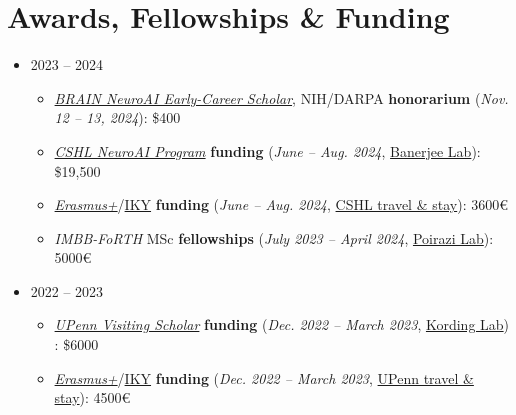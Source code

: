 \documentclass[letterpaper,11pt]{article}
\begin{document}
\section{Awards, Fellowships \& Funding}
\begin{itemize}
  \item 2023 -- 2024
    \setlength\itemsep{-0.3em}
    \begin{itemize}
      \item \textit{\href{https://n4solutionsllc.com/brainneuroai/}{BRAIN NeuroAI Early-Career Scholar}}, NIH/DARPA \textbf{honorarium} (\textit{Nov. 12 -- 13, 2024})\label{CSHLNeuroAIResearchInternFundingMarker}: \$400
      \item \textit{\href{https://www.cshl.edu/research/neuroscience/neuroai/}{CSHL NeuroAI Program}} \textbf{funding} (\textit{June -- Aug. 2024}, \hyperref[BanerjeeLabMarker]{Banerjee Lab})\label{CSHLNeuroAIResearchInternFundingMarker}: \$19,500
      \item \textit{\href{https://erasmus-plus.ec.europa.eu/opportunities/opportunities-for-individuals/students/traineeships-abroad-for-students}{Erasmus+}}/\href{https://www.iky.gr/en/discover-erasmus}{IKY} \textbf{funding} (\textit{June -- Aug. 2024}, \hyperref[BanerjeeLabMarker]{CSHL travel \& stay}): 3600\euro
      \item \textit{IMBB-FoRTH} MSc \textbf{fellowships} (\textit{July 2023 -- April 2024}, \hyperref[PoiraziLabMarker]{Poirazi Lab})\label{IMBBFoRTHFellowshipMarker}: 5000\euro
    \end{itemize}
  \item 2022 -- 2023
    \setlength\itemsep{-0.3em}
    \begin{itemize}
        \item \textit{\href{https://global.upenn.edu/isss/j1scholar}{UPenn Visiting Scholar}} \textbf{funding} (\textit{Dec. 2022 -- March 2023}, \hyperref[KordingLabMarker]{Kording Lab}) \label{UPennVisitingScholarFundingMarker}: \$6000
        \item \textit{\href{https://erasmus-plus.ec.europa.eu/opportunities/opportunities-for-individuals/students/traineeships-abroad-for-students}{Erasmus+}}/\href{https://www.iky.gr/en/discover-erasmus}{IKY} \textbf{funding} (\textit{Dec. 2022 -- March 2023}, \hyperref[KordingLabMarker]{UPenn travel \& stay}): 4500\euro
    \end{itemize}
\end{itemize}

\end{document}
